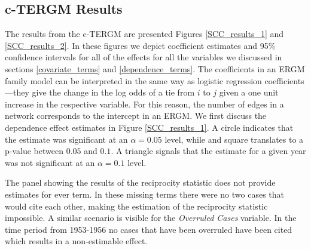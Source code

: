 \documentclass[headsepline=true, abstracton]{scrartcl}
\begin{document}
  
  
  
\subsection{c-TERGM Results}
The results from the c-TERGM are presented Figures \ref{SCC_results_1} and \ref{SCC_results_2}. In these figures we depict coefficient estimates and 95\% confidence intervals for all of the effects for all the variables we discussed in sections \ref{covariate_terms} and \ref{dependence_terms}. The coefficients in an ERGM family model can be interpreted in the same way as logistic regression coefficients---they give the change in the log odds of a tie from $i$ to $j$ given a one unit increase in the respective variable. For this reason, the number of edges in a network corresponds to the intercept in an ERGM. We first discuss the dependence effect estimates in Figure \ref{SCC_results_1}. A circle indicates that the estimate was significant at an $\alpha=0.05$ level, while and square translates to a p-value between $0.05$ and $0.1$. A triangle signals that the estimate for a given year was not significant at an $\alpha=0.1$ level.

The panel showing the results of the reciprocity statistic does not provide estimates for ever term. In these missing terms there were no two cases that would cite each other, making the estimation of the reciprocity statistic impossible. A similar scenario is visible for the \textit{Overruled Cases} variable. In the time period from 1953-1956 no cases that have been overruled have been cited which results in a non-estimable effect.
\end{document}
